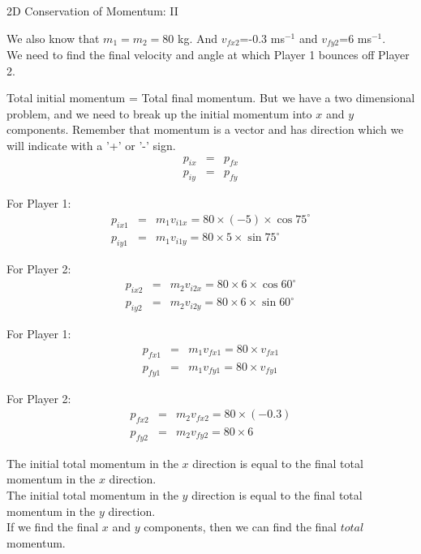 \begin{wex}{2D Conservation of Momentum: II}
{We also know that $m_{1}=m_{2}=80$ kg. And $v_{fx2}$=-0.3 ms$^{-1}$ and $v_{fy2}$=6 ms$^{-1}$. \\
We need to find the final velocity and angle at which Player 1 bounces off Player 2.

Total initial momentum = Total final momentum. 
But we have a two dimensional problem, and we need to break up the initial momentum into $x$ and $y$ components. Remember that momentum is a vector and has direction which we will indicate with a '+' or '-' sign.
\begin{eqnarray*}
p_{ix} &=& p_{fx}\\
p_{iy} &=& p_{fy}
\end{eqnarray*}

For Player 1:
\begin{eqnarray*}
p_{ix1} &=& m_{1}v_{i1x} = 80 \times (-5) \times \cos{75^{\circ}} \\
p_{iy1} &=& m_{1}v_{i1y} = 80 \times 5 \times \sin{75^{\circ}}
\end{eqnarray*}

For Player 2:
\begin{eqnarray*}
p_{ix2} &=& m_{2}v_{i2x} = 80 \times 6\times \cos{60^{\circ}} \\
p_{iy2} &=& m_{2}v_{i2y} = 80 \times 6\times \sin{60^{\circ}} 
\end{eqnarray*}

For Player 1:
\begin{eqnarray*}
p_{fx1} &=& m_{1}v_{fx1} = 80 \times v_{fx1}\\
p_{fy1} &=& m_{1}v_{fy1} = 80 \times v_{fy1}
\end{eqnarray*}

For Player 2:
\begin{eqnarray*}
p_{fx2} &=& m_{2}v_{fx2} = 80 \times (-0.3) \\
p_{fy2} &=& m_{2}v_{fy2} = 80 \times 6 
\end{eqnarray*}

The initial total momentum in the $x$ direction is equal to the final total momentum in the $x$ direction.\\
The initial total momentum in the $y$ direction is equal to the final total momentum in the $y$ direction.\\
If we find the final $x$ and $y$ components, then we can find the final $total$ momentum.

}
\end{wex}

